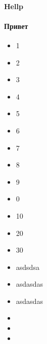 \paragraph{Hellp}

\paragraph{Привет}

\begin{itemize}
    \item 1
    \item 2
    \item 3
    \item 4
    \item 5
    \item 6
    \item 7
    \item 8
    \item 9
    \item 0
    \item 10
    \item 20
    \item 30
    \item asdsdsa
    \item asdasdas
    \item asdasdas
    \item
    \item
    \item
\end{itemize}